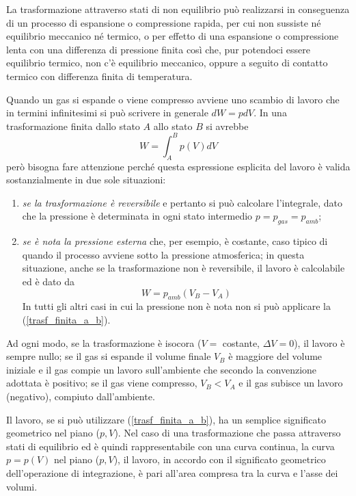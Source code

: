\documentclass[class=book, crop=false, oneside, 12pt]{standalone}
\begin{document}
La trasformazione attraverso stati di non equilibrio può realizzarsi in conseguenza di un processo di espansione o compressione rapida, per cui non sussiste né equilibrio meccanico né termico, o per effetto di una espansione o compressione lenta con una differenza di pressione finita così che, pur potendoci essere equilibrio termico, non c'è equilibrio meccanico, oppure a seguito di contatto termico con differenza finita di temperatura.

Quando un gas si espande o viene compresso avviene uno scambio di lavoro che in termini infinitesimi si può scrivere in generale \( d W = p d V\). 
In una trasformazione finita dallo stato \(A\) allo stato \(B\) si avrebbe
\begin{equation} \label{trasf_finita_a_b}
    W = \int_A^B p(V) d V
\end{equation}
però bisogna fare attenzione perché questa espressione esplicita del lavoro è valida sostanzialmente in due sole situazioni: 
\begin{enumerate}
    \item \emph{se la trasformazione è reversibile} e pertanto si può calcolare l'integrale, dato che la pressione è determinata in ogni stato intermedio \(p = p_{gas} = p_{amb}\);
    \item \emph{se è nota la pressione esterna} che, per esempio, è costante, caso tipico di quando il processo avviene sotto la pressione atmosferica; in questa situazione, anche se la trasformazione non è reversibile, il lavoro è calcolabile ed è dato da
    \begin{equation*}
        W = p_{amb} (V_B - V_A)
    \end{equation*}
    In tutti gli altri casi in cui la pressione non è nota non si può applicare la (\ref{trasf_finita_a_b}).
\end{enumerate}

Ad ogni modo, se la trasformazione è isocora (\(V =\) costante, \(\Delta V = 0\)), il lavoro è sempre nullo; se il gas si espande il volume finale \(V_B\) è maggiore del volume iniziale e il gas compie un lavoro sull'ambiente che secondo la convenzione adottata è positivo; 
se il gas viene compresso, \(V_B < V_A\) e il gas subisce un lavoro (negativo), compiuto dall'ambiente.

Il lavoro, se si può utilizzare (\ref{trasf_finita_a_b}), ha un semplice significato geometrico nel piano (\(p,V\)). 
Nel caso di una trasformazione che passa attraverso stati di equilibrio ed è quindi rappresentabile con una curva continua, la curva \(p = p (V)\) nel piano (\(p, V\)), il lavoro, in accordo con il significato geometrico dell'operazione di integrazione, è pari all'area compresa tra la curva e l'asse dei volumi. 
\end{document}
